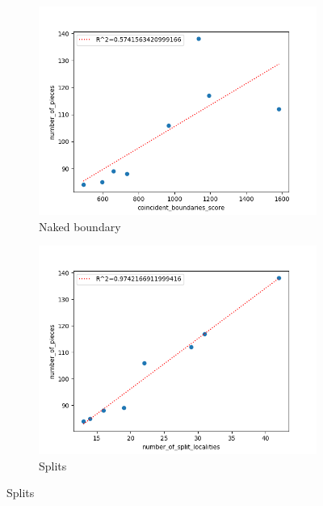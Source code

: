 \documentclass{mgggarticle}
\begin{document}
\begin{figure}
\centering
\begin{subfigure}{0.4\textwidth}
\centering
\includegraphics[width=\textwidth]{figs/scatters/cb.png}
\caption{Naked boundary}
\end{subfigure}
\begin{subfigure}{0.4\textwidth}
\centering
\includegraphics[width=\textwidth]{figs/scatters/splits.png}
\caption{Splits}
\end{subfigure}


\end{figure}
\end{document}
